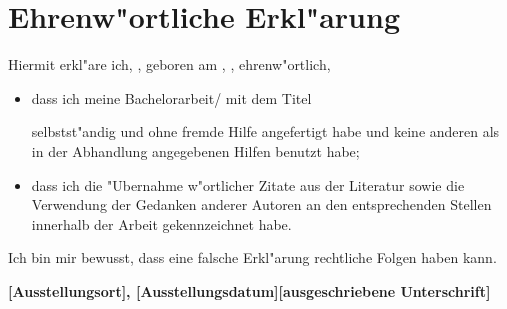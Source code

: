

\chapter*{Ehrenw"ortliche Erkl"arung}
Hiermit erkl"are ich, \textbf{\namedesauthors}, geboren am
\textbf{\geburtsdatum} , \textbf{\geburtsort}, ehrenw"ortlich,
\begin{itemize}
\item dass ich meine Bachelorarbeit/ mit dem Titel 

\textbf{\bachelorarbeittitelDE}



selbstst"andig und ohne fremde Hilfe angefertigt habe und keine anderen als in der
Abhandlung angegebenen Hilfen benutzt habe;
\item dass ich die "Ubernahme w"ortlicher Zitate aus der Literatur
sowie die Verwendung der Gedanken anderer Autoren an den entsprechenden
Stellen innerhalb der Arbeit gekennzeichnet habe.
\end{itemize}
Ich bin mir bewusst, dass eine falsche Erkl"arung rechtliche Folgen haben kann.
\vspace*{3cm}

\textbf{[Ausstellungsort], [Ausstellungsdatum]}\hfill\textbf{[ausgeschriebene Unterschrift]}